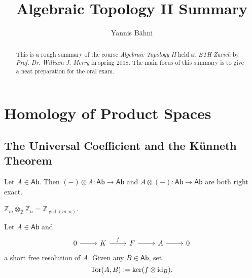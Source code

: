 

\setcounter{section}{1}

\title{Algebraic Topology II Summary}
\author{Yannis B\"{a}hni}
\address[Yannis B\"{a}hni]{University of Zurich, R\"{a}mistrasse 71, 8006 Zurich}



\begin{abstract}
	This is a rough summary of the course \emph{Algebraic Topology II} held at \emph{ETH Zurich} by \emph{Prof. Dr. William J. Merry} in spring $2018$. The main focus of this summary is to give a neat preparation for the oral exam.
\end{abstract}

\maketitle

\tableofcontents

\section*{Homology of Product Spaces}
\subsection*{The Universal Coefficient and the K\"unneth Theorem}

\begin{proposition}
	Let $A \in \mathsf{Ab}$. Then $(-) \otimes A : \mathsf{Ab} \to \mathsf{Ab}$ and $A \otimes (-) : \mathsf{Ab} \to \mathsf{Ab}$ are both right exact.
\end{proposition}

\begin{example}
	$\mathbb{Z}_m \otimes_{\mathbb{Z}} \mathbb{Z}_n = \mathbb{Z}_{\gcd(m,n)}$.
\end{example}

\begin{definition}[Tor]
	Let $A \in \mathsf{Ab}$ and
	\begin{equation*}
		\begin{tikzcd}
			0 \arrow[r] & K \arrow[r,"f"] & F \arrow[r] & A \arrow[r] & 0
		\end{tikzcd} 
	\end{equation*}
	\noindent a short free resolution of $A$. Given any $B \in \mathsf{Ab}$, set
	\begin{equation*}
		\operatorname{Tor}(A,B) := \ker(f \otimes \operatorname{id}_B).
	\end{equation*}
\end{definition}

